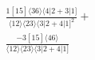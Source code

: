 \documentclass[varwidth, border=5pt]{standalone}
\begin{document}
\begin{my}
$\begin{gathered}
\scriptscriptstyle\frac{1[15]⟨36⟩⟨4|2+3|1]}{⟨12⟩⟨23⟩⟨3|2+4|1]^2}+\\
\scriptscriptstyle\frac{-3[15]⟨46⟩}{⟨12⟩⟨23⟩⟨3|2+4|1]}\phantom{+}
\end{gathered}$
\end{my}
\end{document}
